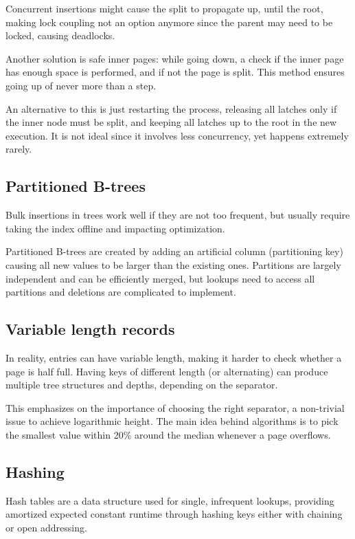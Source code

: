 Concurrent insertions might cause the split to propagate up, until the root, making lock coupling not an option anymore since the parent may need to be locked, causing deadlocks.

Another solution is safe inner pages: while going down, a check if the inner page has enough space is performed, and if not the page is split. This method ensures going up of never more than a step.

An alternative to this is just restarting the process, releasing all latches only if the inner node must be split, and keeping all latches up to the root in the new execution. It is not ideal since it involves less concurrency, yet happens extremely rarely.


\subsection{Partitioned B-trees}
Bulk insertions in trees work well if they are not too frequent, but usually require taking the index offline and impacting optimization.

Partitioned B-trees are created by adding an artificial column (partitioning key) causing all new values to be larger than the existing ones. Partitions are largely independent and can be efficiently merged, but lookups need to access all partitions and deletions are complicated to implement.

\subsection{Variable length records}
In reality, entries can have variable length, making it harder to check whether a page is half full. Having keys of different length (or alternating) can produce multiple tree structures and depths, depending on the separator. 

This emphasizes on the importance of choosing the right separator, a non-trivial issue to achieve logarithmic height. The main idea behind algorithms is to pick the smallest value within 20\% around the median whenever a page overflows.


\subsection{Hashing}
Hash tables are a data structure used for single, infrequent lookups, providing amortized expected constant runtime through hashing keys either with chaining or open addressing.

